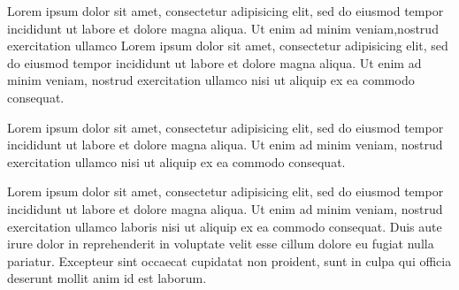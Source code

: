 \documentclass{book}
\begin{document}
\begin{pages}


\begin{Leftside}
\beginnumbering
\pstart
\begin{ledgroup}

Lorem ipsum dolor sit amet, consectetur adipisicing elit, sed do eiusmod tempor incididunt ut labore et dolore magna aliqua. Ut enim ad minim veniam,nostrud exercitation ullamco  
Lorem ipsum dolor sit amet, consectetur adipisicing elit, sed do eiusmod tempor incididunt ut labore et dolore magna aliqua. Ut enim ad minim veniam, nostrud exercitation ullamco  nisi ut aliquip ex ea commodo consequat.
 
\end{ledgroup}
\pend


\pstart
\begin{ledgroup}

Lorem ipsum dolor sit amet, consectetur adipisicing elit, sed do eiusmod tempor incididunt ut labore et dolore magna aliqua. Ut enim ad minim veniam, nostrud exercitation ullamco  nisi ut aliquip ex ea commodo consequat. 

\end{ledgroup}
\pend

\endnumbering
\end{Leftside}

\begin{Rightside}
\beginnumbering

\pstart
\begin{ledgroup}

Lorem ipsum dolor sit amet, consectetur adipisicing elit, sed do eiusmod tempor incididunt ut labore et dolore magna aliqua. Ut enim ad minim veniam, nostrud exercitation ullamco laboris nisi ut aliquip ex ea commodo consequat. Duis aute irure dolor in reprehenderit in voluptate velit esse cillum dolore eu fugiat nulla pariatur. Excepteur sint occaecat cupidatat non proident, sunt in culpa qui officia deserunt mollit anim id est laborum.
\end{ledgroup}


\end{Rightside}
\end{pages}
\end{document}
